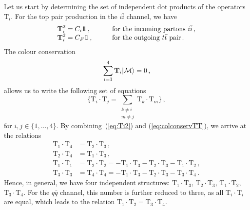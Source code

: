 \documentclass[a4paper,11pt]{article}
\newcommand{\unitop}{{\boldmath{1\!\!1}}}
\newcommand{\ttbar}{\ensuremath{t \bar t}\xspace}
\newcommand{\qqbar}{{\ensuremath{q \bar q}}\xspace}
\newcommand{\calM}{{\cal M}}
\newcommand{\iibar}{{i \bar i}}
\def\cT{\bm{\mathrm{T}}}
\numberwithin{equation}{section}
\begin{document}
Let us start by determining the set of independent dot products of the operators
$\cT_i$. For the top pair production in the $\iibar$ channel, we have
%
\begin{eqnarray}
  \begin{array}{ll}
    \cT_i^2 =  C_i \unitop\,,  &
    \qquad \text{for the incoming partons } \iibar\,,
    \\
    \cT_i^2 =  C_F \unitop\,, &
    \qquad \text{for the outgoing } \ttbar \text{ pair}\,.
    \label{eq:Ti2}
  \end{array}
\end{eqnarray}
%
The colour conservation 
%
\begin{equation}
  \sum_{i=1}^4 \cT_i |\calM\rangle = 0\,,
  \label{eq:colconsdef}
\end{equation}
%
allows us to write the following set of equations
%
\begin{equation}
 \{\cT_i \cdot \cT_j  = 
 \sum_{\substack{k \neq i \\ m \neq j}} \cT_k \cdot \cT_m \}\,,
  \label{eq:colconservTT}
\end{equation}
%
for $i,j \in \{1,\ldots, 4\}$.
%
By combining~(\ref{eq:Ti2}) and (\ref{eq:colconservTT}), we arrive at the
relations
%
\begin{subequations}
  \label{eq:TiTjrelations}
  \begin{align}
    \cT_1 \cdot \cT_4  & = \cT_2 \cdot \cT_3\,,\\ 
    \cT_2 \cdot \cT_4  & = \cT_1 \cdot \cT_3\,,\\ 
    \cT_1 \cdot \cT_1  & = \cT_2 \cdot \cT_2  =
    -\cT_1 \cdot \cT_3  - \cT_2 \cdot \cT_3  - \cT_1 \cdot \cT_2  \,,\\ 
    \cT_3 \cdot \cT_3  & = \cT_4 \cdot \cT_4  =
    -\cT_1 \cdot \cT_3  - \cT_2 \cdot \cT_3  - \cT_3 \cdot \cT_4  \,.
  \end{align}
\end{subequations}
%
Hence, in general, we have four independent structures: 
$\cT_1 \cdot \cT_3$, $\cT_2 \cdot \cT_3$, $\cT_1 \cdot \cT_2$, $\cT_3 \cdot
\cT_4$. For the \qqbar channel, this number is further reduced to
three, as all $\cT_i\cdot \cT_i$ are equal, which leads to the relation
$\cT_1 \cdot \cT_2 = \cT_3 \cdot \cT_4$.
\end{document}
